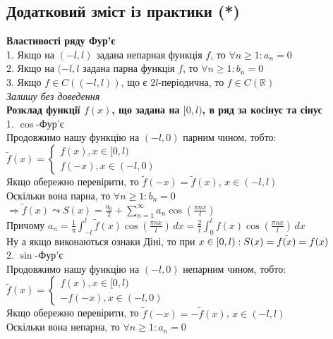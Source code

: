 \documentclass{math_library}
\begin{document}
\subsection{Додатковий зміст із практики (*)}
\textbf{Властивості ряду Фур'є}\\
1. Якщо на $(-l,l)$ задана непарная функція $f$, то $\forall n \geq 1: a_n = 0$\\
2. Якщо на $(-l,l$ задана парна функція $f$, то $\forall n \geq 1: b_n = 0$\\
3. Якщо $f \in C((-l,l))$, що є $2l$-періодична, то $f \in C(\mathbb{R})$\\
\textit{Залишу без доведення}
\bigskip \\
\textbf{Розклад функції $f(x)$, що задана на $[0,l)$, в ряд за косінус та сінус}\\
1. $\cos$-Фур'є\\
Продовжимо нашу функцію на $(-l,0)$ парним чином, тобто:\\
$\tilde{f}(x) = \begin{cases} f(x), x \in [0,l) \\ f(-x), x \in (-l,0) \end{cases}$\\
Якщо обережно перевірити, то $\tilde{f}(-x)=\tilde{f}(x)$, $x \in (-l,l)$\\
Оскільки вона парна, то $\forall n \geq 1: b_n = 0$\\
$\Rightarrow \tilde{f}(x) \leadsto S(x) = \displaystyle \frac{a_0}{2} + \sum_{n=1}^{\infty} a_n \cos \left( \frac{\pi n x}{l} \right)$\\
Причому $a_n = \displaystyle \frac{1}{\pi} \int_{-l}^{l} \tilde{f}(x) \cos \left( \frac{\pi n x}{l} \right) \,dx = \frac{2}{l} \int_0^l f(x) \cos \left( \frac{\pi n x}{l} \right)\,dx$\\
Ну а якщо виконаються ознаки Діні, то при $x \in [0,l): \\ S(x) = \tilde{f(x)} = f(x)$
\bigskip \\
2. $\sin$-Фур'є\\
Продовжимо нашу функцію на $(-l,0)$ непарним чином, тобто:\\
$\tilde{f}(x) = \begin{cases} f(x), x \in [0,l) \\ -f(-x), x \in (-l,0) \end{cases}$\\
Якщо обережно перевірити, то $\tilde{f}(-x)=-\tilde{f}(x)$, $x \in (-l,l)$\\
Оскільки вона непарна, то $\forall n \geq 1: a_n = 0$\\
\end{document}
